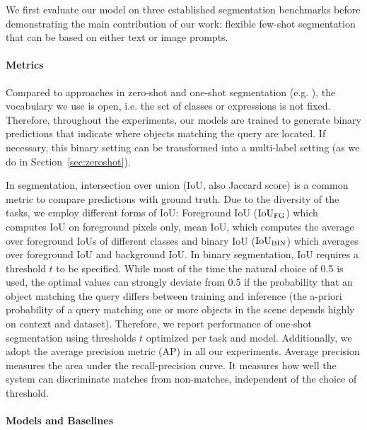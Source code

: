 We first evaluate our model on three established segmentation benchmarks before demonstrating the main contribution of our work: flexible few-shot segmentation that can be based on either text or image prompts.

\paragraph{Metrics}

Compared to approaches in zero-shot and one-shot segmentation (e.g. \cite{bucher19, li20}), the vocabulary we use is open, i.e. the set of classes or expressions is not fixed. Therefore, throughout the experiments, our models are trained to generate binary predictions that indicate where objects matching the query are located. If necessary, this binary setting can be transformed into a multi-label setting (as we do in Section~\ref{sec:zeroshot}).

In segmentation, intersection over union (IoU, also Jaccard score) is a common metric to compare predictions with ground truth. 
Due to the diversity of the tasks, we employ different forms of IoU: Foreground IoU ($\text{IoU}_{\text{FG}}$) which computes IoU on foreground pixels only, mean IoU, which computes the average over foreground IoUs of different classes and binary IoU ($\text{IoU}_{\text{BIN}}$) which averages over foreground IoU and background IoU.
In binary segmentation, IoU requires a threshold $t$ to be specified. While most of the time the natural choice of 0.5 is used, the optimal values can strongly deviate from 0.5 if the probability that an object matching the query differs between training and inference (the a-priori probability of a query matching one or more objects in the scene depends highly on context and dataset). 
Therefore, we report performance of one-shot segmentation using thresholds $t$ optimized per task and model. Additionally, we adopt the average precision metric (AP) in all our experiments.
Average precision measures the area under the recall-precision curve. It measures how well the system can discriminate matches from non-matches, independent of the choice of threshold. %

\paragraph{Models and Baselines}

